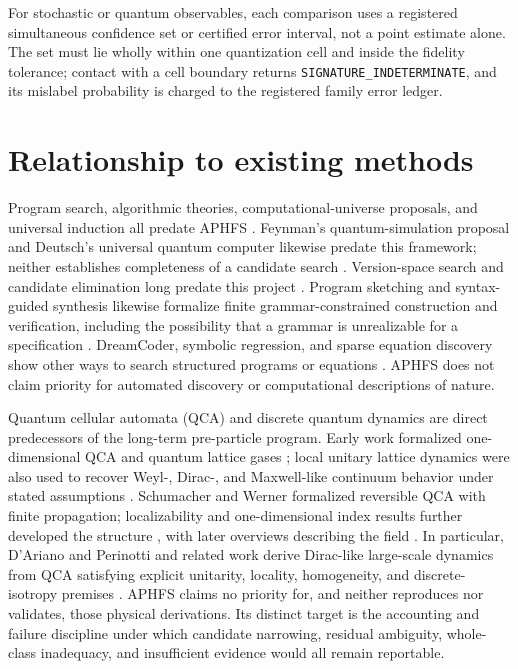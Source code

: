 \documentclass[10pt]{article}
\theoremstyle{definition}
\begin{document}
For stochastic or quantum observables, each comparison uses a registered simultaneous confidence
set or certified error interval, not a point estimate alone. The set must lie wholly within one
quantization cell and inside the fidelity tolerance; contact with a cell boundary returns
\texttt{SIGNATURE\_INDETERMINATE}, and its mislabel probability is charged to the registered
family error ledger.

\section{Relationship to existing methods}

Program search, algorithmic theories, computational-universe proposals, and universal induction
all predate APHFS \citep{zuse1969,fredkin1990,wolfram2002,wolfram2020,thooft2016,schmidhuber2000,hutter2005}.
Feynman's quantum-simulation proposal and Deutsch's universal quantum computer likewise predate
this framework; neither establishes completeness of a candidate search \citep{feynman1982,deutsch1985}.
Version-space search and candidate elimination long predate this project
\citep{mitchell1977candidate,mitchell1982}.
Program sketching and syntax-guided synthesis likewise formalize finite grammar-constrained
construction and verification, including the possibility that a grammar is unrealizable for a
specification \citep{solarlezama2006,alur2013sygus,kim2023unrealizability}. DreamCoder, symbolic
regression, and sparse equation discovery show other ways to search structured programs or
equations \citep{ellis2021,bongard2007,schmidt2009,brunton2016,udrescu2020}.
APHFS does not claim priority for automated discovery or computational descriptions of nature.

Quantum cellular automata (QCA) and discrete quantum dynamics are direct predecessors of the
long-term pre-particle program. Early work formalized one-dimensional QCA and quantum lattice
gases \citep{watrous1995qca,meyer1996qca}; local unitary lattice dynamics were also used to recover
Weyl-, Dirac-, and Maxwell-like continuum behavior under stated assumptions
\citep{bialynicki1994}. Schumacher and Werner formalized reversible QCA with finite propagation;
localizability and one-dimensional index results further developed the structure
\citep{schumacher2004,arrighi2011localizability,gross2012qcaindex}, with later overviews describing
the field \citep{arrighi2019,farrelly2020}. In particular,
D'Ariano and Perinotti and related work derive Dirac-like large-scale dynamics from QCA satisfying
explicit unitarity, locality, homogeneity, and discrete-isotropy premises
\citep{darianoperinotti2014,bisio2015dirac,bisio2016light,darianoperinotti2017}. APHFS claims no
priority for, and neither reproduces nor validates, those physical derivations. Its distinct target
is the accounting and failure discipline under which candidate narrowing, residual ambiguity,
whole-class inadequacy, and insufficient evidence would all remain reportable.
\end{document}
